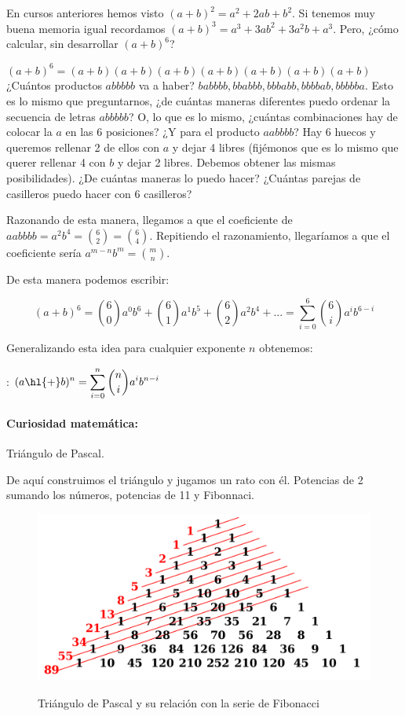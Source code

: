 \documentclass[palatino,nosec]{Docencia}
\begin{document}

En cursos anteriores hemos visto $(a+b)^2 = a^2+2ab+b^2$. Si tenemos muy buena memoria igual recordamos $(a+b)^3 = a^3+3ab^2+3a^2b+a^3$. Pero, ¿cómo calcular, sin desarrollar $(a+b)^6$? 

$(a+b)^6 = (a+b)(a+b)(a+b)(a+b)(a+b)(a+b)(a+b)$ ¿Cuántos productos $abbbbb$ va a haber? $babbbb,bbabbb,bbbabb,bbbbab,bbbbba$. Esto es lo mismo que preguntarnos, ¿de cuántas maneras diferentes puedo ordenar la secuencia de letras $abbbbb$? O, lo que es lo mismo, ¿cuántas combinaciones hay de colocar la $a$ en las 6 posiciones?
%
¿Y para el producto $aabbbb$? Hay 6 huecos y queremos rellenar 2 de ellos con $a$ y dejar 4 libres (fijémonos que es lo mismo que querer rellenar 4 con $b$ y dejar 2 libres. Debemos obtener las mismas posibilidades). ¿De cuántas maneras lo puedo hacer? ¿Cuántas parejas de casilleros puedo hacer con 6 casilleros?

Razonando de esta manera, llegamos a que el coeficiente de $aabbbb = a^2b^4 = \binom{6}{2}=\binom{6}{4}$. Repitiendo el razonamiento, llegaríamos a que el coeficiente sería $a^{m-n}b^m = \binom{m}{n}$. 

De esta manera podemos escribir:

\[
	(a+b)^6 = \binom{6}{0}a^0b^6 + \binom{6}{1}a^1b^5 + \binom{6}{2}a^2b^4 + ... = \sum_{i=0}^6 \binom{6}{i}a^ib^{6-i}
\]

Generalizando esta idea para cualquier exponente $n$ obtenemos:

:
$
\displaystyle (a\text{\hl{+}}b)^n = \sum_{i=0}^n \binom{n}{i} a^ib^{n-i}
$

\paragraph{Curiosidad matemática:} Triángulo de Pascal.

De aquí construimos el triángulo y jugamos un rato con él. Potencias de 2 sumando los números, potencias de 11 y Fibonnaci.

\begin{figure}[hbpt]
	\centering
	\includegraphics[scale=0.17]{img/Pascal.png}
	\label{img::TrianguloPascal}
	\caption{Triángulo de Pascal y su relación con la serie de Fibonacci}
\end{figure}
\end{document}
